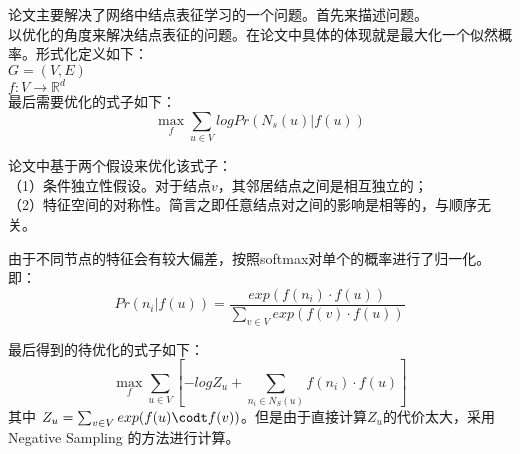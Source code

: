 
论文主要解决了网络中结点表征学习的一个问题。首先来描述问题。\\
以优化的角度来解决结点表征的问题。在论文中具体的体现就是最大化一个似然概率。形式化定义如下：\\
$G = (V, E)$\\
$f : V \to \mathbb{R}^d$ \\
最后需要优化的式子如下：\\
$$\mathop{max}_{f}\sum_{u \in V} log Pr(N_s(u) | f(u) ) $$

论文中基于两个假设来优化该式子： \\
（1）条件独立性假设。对于结点$v$，其邻居结点之间是相互独立的；\\
（2）特征空间的对称性。简言之即任意结点对之间的影响是相等的，与顺序无关。

由于不同节点的特征会有较大偏差，按照softmax对单个的概率进行了归一化。即：\\
$$
Pr(n_i | f(u) ) = \frac{exp(f(n_i)\cdot f(u))}{\sum_{v\in V} exp(f(v)\cdot f(u))}
$$

最后得到的待优化的式子如下：\\
$$
\mathop{max}_{f}\sum_{u \in V}[ -log Z_u + \sum_{n_i \in N_S(u)} f(n_i) \cdot f(u) ]
$$
其中 $Z_u = \sum_{v\in V} exp(f(u) \codt f(v))$。但是由于直接计算$Z_u$的代价太大，采用Negative Sampling 的方法进行计算。